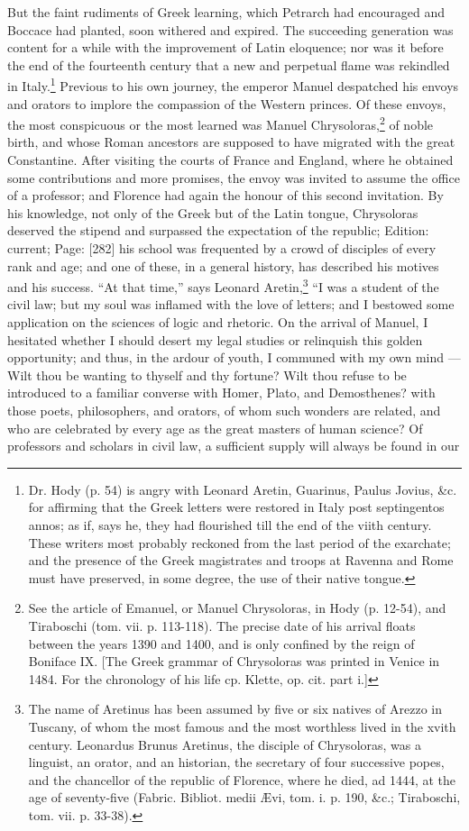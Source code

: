 But the faint rudiments of Greek learning, which Petrarch had encouraged and Boccace had planted, soon withered and expired. The succeeding generation was content for a while with the improvement of Latin eloquence; nor was it before the end of the fourteenth century that a new and perpetual flame was rekindled in Italy.\footnote{Dr. Hody (p. 54) is angry with Leonard Aretin, Guarinus, Paulus Jovius, \&c. for affirming that the Greek letters were restored in Italy post septingentos annos; as if, says he, they had flourished till the end of the viith century. These writers most probably reckoned from the last period of the exarchate; and the presence of the Greek magistrates and troops at Ravenna and Rome must have preserved, in some degree, the use of their native tongue.} Previous to his own journey, the emperor Manuel despatched his envoys and orators to implore the compassion of the Western princes. Of these envoys, the most conspicuous or the most learned was Manuel Chrysoloras,\footnote{See the article of Emanuel, or Manuel Chrysoloras, in Hody (p. 12-54), and Tiraboschi (tom. vii. p. 113-118). The precise date of his arrival floats between the years 1390 and 1400, and is only confined by the reign of Boniface IX. [The Greek grammar of Chrysoloras was printed in Venice in 1484. For the chronology of his life cp. Klette, op. cit. part i.]} of noble birth, and whose Roman ancestors are supposed to have migrated with the great Constantine. After visiting the courts of France and England, where he obtained some contributions and more promises, the envoy was invited to assume the office of a professor; and Florence had again the honour of this second invitation. By his knowledge, not only of the Greek but of the Latin tongue, Chrysoloras deserved the stipend and surpassed the expectation of the republic; Edition: current; Page: [282] his school was frequented by a crowd of disciples of every rank and age; and one of these, in a general history, has described his motives and his success. \texthebrew{“}At that time,\texthebrew{}” says Leonard Aretin,\footnote{The name of Aretinus has been assumed by five or six natives of Arezzo in Tuscany, of whom the most famous and the most worthless lived in the xvith century. Leonardus Brunus Aretinus, the disciple of Chrysoloras, was a linguist, an orator, and an historian, the secretary of four successive popes, and the chancellor of the republic of Florence, where he died, ad 1444, at the age of seventy-five (Fabric. Bibliot. medii Ævi, tom. i. p. 190, \&c.; Tiraboschi, tom. vii. p. 33-38).} \texthebrew{“}I was a student of the civil law; but my soul was inflamed with the love of letters; and I bestowed some application on the sciences of logic and rhetoric. On the arrival of Manuel, I hesitated whether I should desert my legal studies or relinquish this golden opportunity; and thus, in the ardour of youth, I communed with my own mind \texthebrew{—} Wilt thou be wanting to thyself and thy fortune? Wilt thou refuse to be introduced to a familiar converse with Homer, Plato, and Demosthenes? with those poets, philosophers, and orators, of whom such wonders are related, and who are celebrated by every age as the great masters of human science? Of professors and scholars in civil law, a sufficient supply will always be found in our 